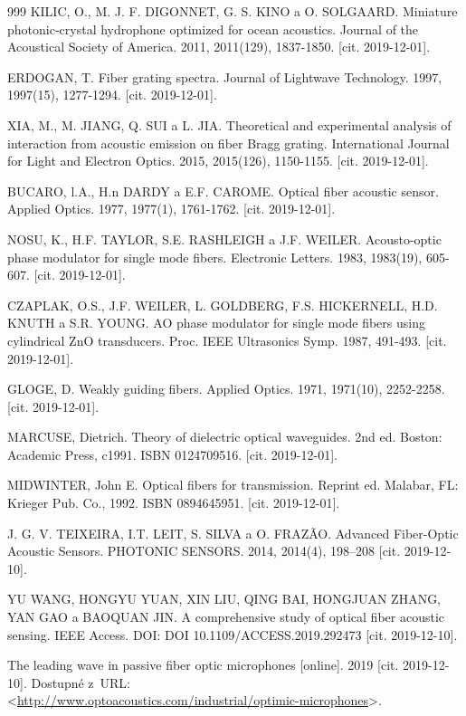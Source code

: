 \begin{thebibliography}{999}
	 KILIC, O., M. J. F. DIGONNET, G. S. KINO a O. SOLGAARD. Miniature photonic-crystal hydrophone optimized for ocean acoustics. Journal of the Acoustical Society of America. 2011, 2011(129), 1837-1850. [cit. 2019-12-01].

	 ERDOGAN, T. Fiber grating spectra. Journal of Lightwave Technology. 1997, 1997(15), 1277-1294. [cit. 2019-12-01].
	
	XIA, M., M. JIANG, Q. SUI a L. JIA. Theoretical and experimental analysis of interaction from acoustic emission on fiber Bragg grating. International Journal for Light and Electron Optics. 2015, 2015(126), 1150-1155. [cit. 2019-12-01].

	BUCARO, l.A., H.n DARDY a E.F. CAROME. Optical fiber acoustic sensor. Applied Optics. 1977, 1977(1), 1761-1762. [cit. 2019-12-01].

	NOSU, K., H.F. TAYLOR, S.E. RASHLEIGH a J.F. WEILER. Acousto-optic phase modulator for single mode fibers. Electronic Letters. 1983, 1983(19), 605-607. [cit. 2019-12-01].

	CZAPLAK, O.S., J.F. WEILER, L. GOLDBERG, F.S. HICKERNELL, H.D. KNUTH a S.R. YOUNG. AO phase modulator for single mode fibers using cylindrical ZnO transducers. Proc. IEEE Ultrasonics Symp. 1987, 491-493. [cit. 2019-12-01].

	GLOGE, D. Weakly guiding fibers. Applied Optics. 1971, 1971(10), 2252-2258. [cit. 2019-12-01].

	MARCUSE, Dietrich. Theory of dielectric optical waveguides. 2nd ed. Boston: Academic Press, c1991. ISBN 0124709516. [cit. 2019-12-01].

	MIDWINTER, John E. Optical fibers for transmission. Reprint ed. Malabar, FL: Krieger Pub. Co., 1992. ISBN 0894645951. [cit. 2019-12-01].
	
J. G. V. TEIXEIRA, I.T. LEIT, S. SILVA a O. FRAZÃO. Advanced Fiber-Optic Acoustic Sensors. PHOTONIC SENSORS. 2014, 2014(4), 198–208 [cit. 2019-12-10].

	YU WANG, HONGYU YUAN, XIN LIU, QING BAI, HONGJUAN ZHANG, YAN GAO a BAOQUAN JIN. A comprehensive study of optical fiber acoustic sensing. IEEE Access. DOI: DOI 10.1109/ACCESS.2019.292473 [cit. 2019-12-10]. 

	The leading wave in passive fiber optic microphones [online]. 2019 [cit. 2019-12-10]. Dostupné z~URL:\\ 
<\url{http://www.optoacoustics.com/industrial/optimic-microphones}>.


\end{thebibliography}
